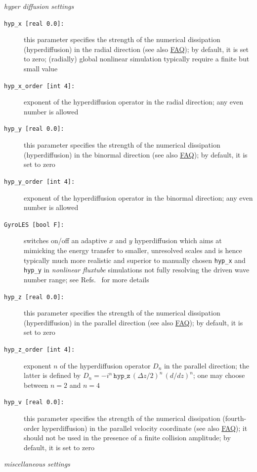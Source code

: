 \documentclass[12pt]{article}
\begin{document}
%
{\em hyper diffusion settings}
\begin{description}
\item[\texttt{hyp\_x [real 0.0]:}] this parameter specifies the strength of the numerical dissipation
  (hyperdiffusion) in the radial direction (see also \hyperlink{hyp-advice}{FAQ}); by default, it is set to zero;
  (radially) global nonlinear simulation typically require a finite but small value
\item[\texttt{hyp\_x\_order [int 4]:}] exponent of the hyperdiffusion operator in the radial direction;
  any even number is allowed
\item[\texttt{hyp\_y [real 0.0]:}] this parameter specifies the strength of the numerical dissipation
  (hyperdiffusion) in the binormal direction (see also \hyperlink{hyp-advice}{FAQ}); by default, it is set to zero
\item[\texttt{hyp\_y\_order [int 4]:}] exponent of the hyperdiffusion operator in the binormal direction;
  any even number is allowed
\item[\hypertarget{gyroles}{\tt GyroLES [bool F]:}] switches on/off an adaptive $x$ and $y$ hyperdiffusion
 which aims at mimicking the energy transfer to smaller, unresolved scales and is hence typically much more
 realistic and superior to manually chosen {\tt hyp\_x} and {\tt hyp\_y} in {\em nonlinear fluxtube} simulations
 not fully resolving the driven wave number range;
 see Refs.~\cite{MorelPoP11, BanonPhD, BanonPoP14} for more details
\item[\texttt{hyp\_z [real 0.0]:}] this parameter specifies the strength of the numerical dissipation
  (hyperdiffusion) in the parallel direction (see also \hyperlink{hyp-advice}{FAQ}); by default, it is set to zero
\item[\texttt{hyp\_z\_order [int 4]:}] exponent $n$ of the hyperdiffusion operator $D_n$ in the parallel
  direction; the latter is defined by $D_n = - i^n\,\texttt{hyp\_z}\,(\Delta z/2)^n\,(d/dz)^n$; one may
  choose between $n=2$ and $n=4$
\item[\texttt{hyp\_v [real 0.0]:}] this parameter specifies the strength of the numerical dissipation
  (fourth-order hyperdiffusion) in the parallel velocity coordinate (see also \hyperlink{hyp-advice}{FAQ});
  it should not be used in the presence of a finite collision amplitude; by default, it is set to zero
\end{description}
%
{\em miscellaneous settings}
\end{document}
